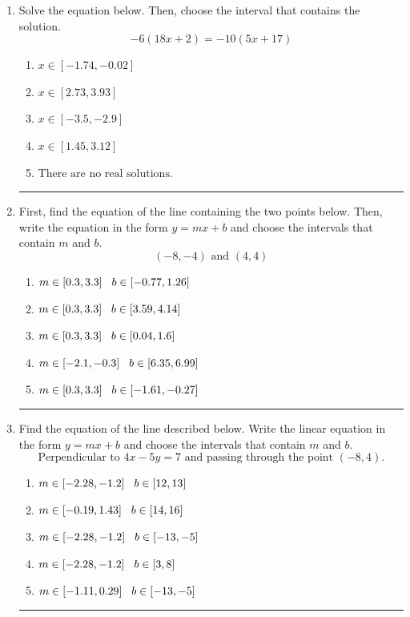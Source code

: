 \documentclass[14pt]{extbook}
\newcommand{\litem}[1]{\item#1\hspace*{-1cm}\rule{\textwidth}{0.4pt}}
\begin{document}
\begin{enumerate}
{\begin{enumerate}[label=\Alph*.]
\end{enumerate} }
\litem{
Solve the equation below. Then, choose the interval that contains the solution.\[ -6(18x + 2) = -10(5x + 17) \]\begin{enumerate}[label=\Alph*.]
\item \( x \in [-1.74, -0.02] \)
\item \( x \in [2.73, 3.93] \)
\item \( x \in [-3.5, -2.9] \)
\item \( x \in [1.45, 3.12] \)
\item \( \text{There are no real solutions.} \)

\end{enumerate} }
\litem{
First, find the equation of the line containing the two points below. Then, write the equation in the form $ y=mx+b $ and choose the intervals that contain $m$ and $b$.\[ (-8, -4) \text{ and } (4, 4) \]\begin{enumerate}[label=\Alph*.]
\item \( m \in [0.3, 3.3] \hspace*{3mm} b \in [-0.77, 1.26] \)
\item \( m \in [0.3, 3.3] \hspace*{3mm} b \in [3.59, 4.14] \)
\item \( m \in [0.3, 3.3] \hspace*{3mm} b \in [0.04, 1.6] \)
\item \( m \in [-2.1, -0.3] \hspace*{3mm} b \in [6.35, 6.99] \)
\item \( m \in [0.3, 3.3] \hspace*{3mm} b \in [-1.61, -0.27] \)

\end{enumerate} }
\litem{
Find the equation of the line described below. Write the linear equation in the form $ y=mx+b $ and choose the intervals that contain $m$ and $b$.\[ \text{Perpendicular to } 4 x - 5 y = 7 \text{ and passing through the point } (-8, 4). \]\begin{enumerate}[label=\Alph*.]
\item \( m \in [-2.28, -1.2] \hspace*{3mm} b \in [12, 13] \)
\item \( m \in [-0.19, 1.43] \hspace*{3mm} b \in [14, 16] \)
\item \( m \in [-2.28, -1.2] \hspace*{3mm} b \in [-13, -5] \)
\item \( m \in [-2.28, -1.2] \hspace*{3mm} b \in [3, 8] \)
\item \( m \in [-1.11, 0.29] \hspace*{3mm} b \in [-13, -5] \)


\end{enumerate}}
\end{enumerate}
\end{document}
